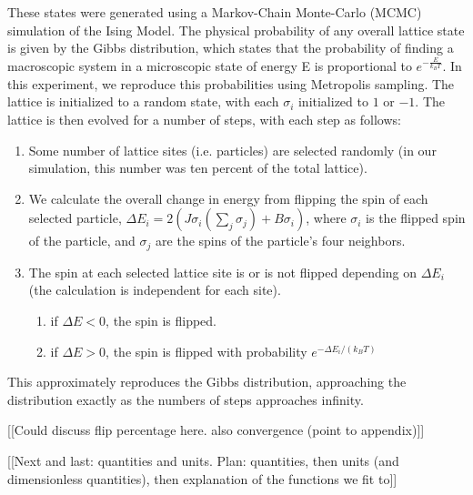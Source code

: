 \documentclass[letter,scriptaddress,twocolumn, prl]{revtex4}
\begin{document}
These states were generated using a Markov-Chain Monte-Carlo (MCMC) simulation of the Ising Model. The physical probability of any overall lattice state is given by the Gibbs distribution, which states that the probability of finding a macroscopic system in a microscopic state of energy E is proportional to $e^{-\frac{E}{k_BT}}$. In this experiment, we reproduce this probabilities using Metropolis sampling. The lattice is initialized to a random state, with each $\sigma_i$ initialized to $1$ or $-1$. The lattice is then evolved for a number of steps, with each step as follows:
\begin{enumerate}
	\item Some number of lattice sites (i.e. particles) are selected randomly (in our simulation, this number was ten percent of the total lattice).
	\item We calculate the overall change in energy from flipping the spin of each selected particle, $\Delta E_i = 2(J\sigma_i(\sum_j\sigma_j) + B\sigma_i)$, where $\sigma_i$ is the flipped spin of the particle, and $\sigma_j$ are the spins of the particle's four neighbors.
	\item The spin at each selected lattice site is or is not flipped depending on $\Delta E_i$ (the calculation is independent for each site).
	\begin{enumerate}
		\item if $\Delta E < 0$, the spin is flipped.
		\item if $\Delta E > 0$, the spin is flipped with probability $e^{-\Delta E_i/(k_BT)}$
	\end{enumerate}
\end{enumerate}

This approximately reproduces the Gibbs distribution, approaching the distribution exactly as the numbers of steps approaches infinity.

[[Could discuss flip percentage here. also convergence (point to appendix)]]

[[Next and last: quantities and units. Plan: quantities, then units (and dimensionless quantities), then explanation of the functions we fit to]]
\end{document}
